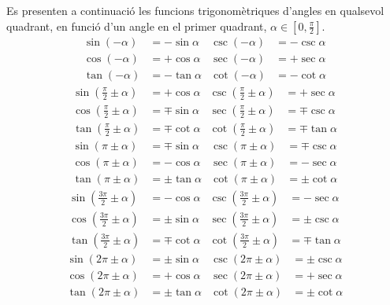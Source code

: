  Es presenten a continuaci\'{o}  les funcions trigonom\`{e}triques d'angles en qualsevol
quadrant, en funci\'{o} d'un angle en el primer quadrant,
$\alpha\in[0,\frac{\pi}{2}]$.
\begin{subequations}
\begin{align}
    \sin(-\alpha) &= -\sin\alpha  & \csc(-\alpha) &= -\csc\alpha \\
    \cos(-\alpha) &= +\cos\alpha  & \sec(-\alpha) &= +\sec\alpha \\
    \tan(-\alpha) &= -\tan\alpha  & \cot(-\alpha) &= -\cot\alpha
\end{align}
\end{subequations}
\vspace{-5mm}
\begin{subequations}
\begin{align}
    \sin\left(\frac{\pi}{2}\pm\alpha\right) &= +\cos\alpha    & \csc\left(\frac{\pi}{2}\pm\alpha\right) &= +\sec\alpha \\
    \cos\left(\frac{\pi}{2}\pm\alpha\right) &= \mp\sin\alpha  & \sec\left(\frac{\pi}{2}\pm\alpha\right) &= \mp\csc\alpha \\
    \tan\left(\frac{\pi}{2}\pm\alpha\right) &= \mp\cot\alpha  & \cot\left(\frac{\pi}{2}\pm\alpha\right) &= \mp\tan\alpha
\end{align}
\end{subequations}
\vspace{-5mm}
\begin{subequations}
\begin{align}
    \sin(\pi\pm\alpha) &= \mp\sin\alpha  & \csc(\pi\pm\alpha) &= \mp\csc\alpha \\
    \cos(\pi\pm\alpha) &= -\cos\alpha    & \sec(\pi\pm\alpha) &= -\sec\alpha \\
    \tan(\pi\pm\alpha) &= \pm\tan\alpha  & \cot(\pi\pm\alpha) &= \pm\cot\alpha
\end{align}
\end{subequations}
\vspace{-5mm}
\begin{subequations}
\begin{align}
    \sin\left(\frac{3\pi}{2}\pm\alpha\right) &= -\cos\alpha    & \csc\left(\frac{3\pi}{2}\pm\alpha\right) &= -\sec\alpha \\
    \cos\left(\frac{3\pi}{2}\pm\alpha\right) &= \pm\sin\alpha  & \sec\left(\frac{3\pi}{2}\pm\alpha\right) &= \pm\csc\alpha \\
    \tan\left(\frac{3\pi}{2}\pm\alpha\right) &= \mp\cot\alpha  & \cot\left(\frac{3\pi}{2}\pm\alpha\right) &= \mp\tan\alpha
\end{align}
\end{subequations}
\vspace{-5mm}
\begin{subequations}
\begin{align}
    \sin(2\pi\pm\alpha) &= \pm\sin\alpha  & \csc(2\pi\pm\alpha) &= \pm\csc\alpha \\
    \cos(2\pi\pm\alpha) &= +\cos\alpha    & \sec(2\pi\pm\alpha) &= +\sec\alpha \\
    \tan(2\pi\pm\alpha) &= \pm\tan\alpha  & \cot(2\pi\pm\alpha) &= \pm\cot\alpha
\end{align}
\end{subequations}

